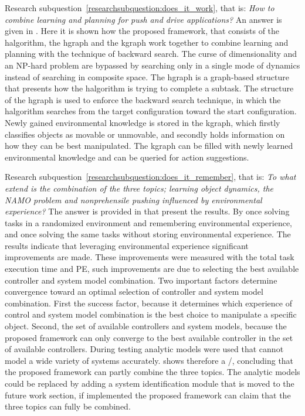 Research subquestion~\ref{researchsubquestion:does_it_work}, that is: \textit{How to combine learning and planning for push and drive applications?} An answer is given in . Here it is shown how the proposed framework, that consists of the \acl{halgorithm}, the \acl{hgraph} and the \acl{kgraph} work together to combine learning and planning with the technique of backward search. The curse of dimensionality and an \ac{NP-hard} problem are bypassed by searching only in a single mode of dynamics instead of searching in composite space. The \ac{hgraph} is a graph-based structure that presents how the \ac{halgorithm} is trying to complete a subtask. The structure of the \ac{hgraph} is used to enforce the backward search technique, in which the \ac{halgorithm} searches from the target configuration toward the start configuration. Newly gained environmental knowledge is stored in the \ac{kgraph}, which firstly classifies objects as movable or unmovable, and secondly holds information on how they can be best manipulated. The \ac{kgraph} can be filled with newly learned environmental knowledge and can be queried for action suggestions.\bs

Research subquestion~\ref{researchsubquestion:does_it_remember}, that is: \textit{
To what extend is the combination of the three topics; learning object dynamics, the \ac{NAMO} problem and nonprehensile pushing influenced by environmental experience?} The answer is provided in  that present the results. By once solving tasks in a randomized environment and remembering environmental experience, and once solving the same tasks without storing environmental experience. The results indicate that leveraging environmental experience significant improvements are made. These improvements were measured with the total task execution time and \acl{PE}, such improvements are due to selecting the best available controller and system model combination. Two important factors determine convergence toward an optimal selection of controller and system model combination. First the success factor, because it determines which experience of control and system model combination is the best choice to manipulate a specific object. Second, the set of available controllers and system models, because the proposed framework can only converge to the best available controller in the set of available controllers. During testing analytic models were used that cannot model a wide variety of systems accurately.  shows therefore a \xmark/\cmark, concluding that the proposed framework can partly combine the three topics. The analytic models could be replaced by adding a system identification module that is moved to the future work section, if implemented the proposed framework can claim that the three topics can fully be combined.\bs

